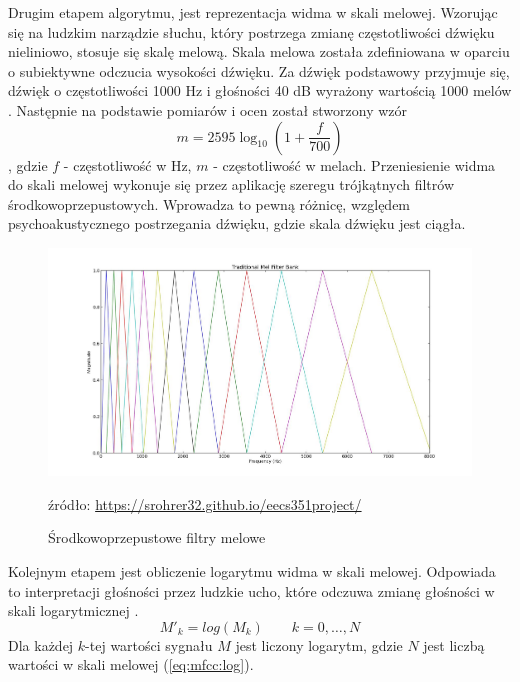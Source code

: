 \documentclass[a4paper,12pt,twoside,openany]{report}
\newcommand{\Eq}[1]{(\ref{#1})}
\newcommand{\zrodlo}[1]{\captionsetup{font=scriptsize}\caption*{źródło: \url{#1}}}
\begin{document}
Drugim etapem algorytmu, jest reprezentacja widma w skali melowej. 
Wzorując się na ludzkim narządzie słuchu, 
który postrzega zmianę częstotliwości dźwięku nieliniowo, stosuje się skalę melową.
Skala melowa została zdefiniowana w oparciu o subiektywne odczucia wysokości dźwięku.
Za dźwięk podstawowy przyjmuje się, dźwięk o częstotliwości 1000 Hz i głośności 40 dB wyrażony wartością 1000 melów \cite{KrishnaKishore2013}.
Następnie na podstawie pomiarów i ocen został stworzony wzór
\begin{equation}
	m=2595\log _{10}\left(1+{\frac {f}{700}}\right)
\end{equation}, gdzie
$f$ - częstotliwość w Hz,
$m$ - częstotliwość w melach.
Przeniesienie widma do skali melowej wykonuje się przez aplikację szeregu trójkątnych filtrów środkowoprzepustowych. 
Wprowadza to pewną różnicę, względem psychoakustycznego postrzegania dźwięku, gdzie skala dźwięku jest ciągła.
\begin{figure}[h]
	\centering
	\includegraphics[width=\textwidth]{melfilterbank}
	\caption{Środkowoprzepustowe filtry melowe}
	\zrodlo{https://srohrer32.github.io/eecs351project/}
	\label{rys:mfcc:melfilterbank}
\end{figure}

Kolejnym etapem jest obliczenie logarytmu widma w skali melowej.
Odpowiada to interpretacji głośności przez ludzkie ucho,
które odczuwa zmianę głośności w skali logarytmicznej \cite{Hossan2013}.
\begin{equation}
	M'_k=log(M_k)\qquad k=0, \dots, N
	\label{eq:mfcc:log}
\end{equation}
Dla każdej $k$-tej wartości sygnału $M$ jest liczony logarytm, gdzie $N$ jest liczbą wartości w skali melowej \Eq{eq:mfcc:log}.
\end{document}
